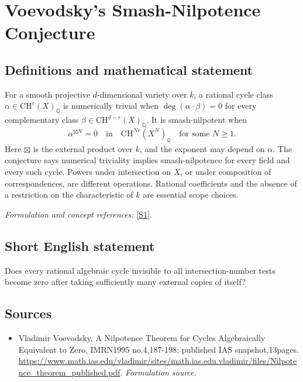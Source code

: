 \documentclass[11pt]{article}
\begin{document}
\section*{\texorpdfstring{Voevodsky's Smash-Nilpotence Conjecture}{Voevodsky's Smash-Nilpotence Conjecture}}\label{182}
\subsection{Definitions and mathematical statement}
For a smooth projective $d$-dimensional variety over $k$, a rational cycle class $\alpha\in\mathrm{CH}^r(X)_{{\mathbb{Q}}}$ is numerically trivial when
$\deg(\alpha\cdot\beta)=0$ for every complementary class $\beta\in\mathrm{CH}^{d-r}(X)_{{\mathbb{Q}}}$. It is smash-nilpotent when
\[
 \alpha^{\boxtimes N}=0\quad\text{in}\quad\mathrm{CH}^{Nr}(X^N)_{{\mathbb{Q}}}
 \quad\text{for some }N\ge1.
\]
Here $\boxtimes$ is the external product over $k$, and the exponent may depend on $\alpha$. The conjecture says numerical triviality implies smash-nilpotence for every field and every such cycle. Powers under intersection on $X$, or under composition of correspondences, are different operations. Rational coefficients and the absence of a restriction on the characteristic of $k$ are essential scope choices.
\par\smallskip\textit{Formulation and concept references:} \href{https://www.math.ias.edu/vladimir/sites/math.ias.edu.vladimir/files/Nilpotence_theorem_published.pdf}{[S1]}.

\subsection{Short English statement}
Does every rational algebraic cycle invisible to all intersection-number tests become zero after taking sufficiently many external copies of itself?
\subsection{Sources}
\begin{itemize}
\item[S1]Vladimir Voevodsky, A Nilpotence Theorem for Cycles Algebraically Equivalent to Zero, IMRN1995 no.4,187-198; published IAS snapshot,13pages.
\url{https://www.math.ias.edu/vladimir/sites/math.ias.edu.vladimir/files/Nilpotence_theorem_published.pdf}.
\textit{Formulation source.}
\end{itemize}
\end{document}
